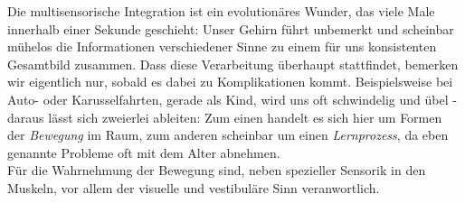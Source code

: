 Die multisensorische Integration ist ein evolution\"ares Wunder, das viele Male innerhalb einer Sekunde geschieht: 
Unser Gehirn f\"uhrt unbemerkt und scheinbar m\"uhelos die Informationen verschiedener Sinne zu einem f\"ur uns konsistenten Gesamtbild zusammen. 
Dass diese Verarbeitung \"uberhaupt stattfindet, bemerken wir eigentlich nur, sobald es dabei zu Komplikationen kommt. Beispielsweise bei Auto- oder Karusselfahrten, gerade als Kind, wird uns oft schwindelig und \"ubel - daraus l\"asst sich zweierlei ableiten: 
Zum einen handelt es sich hier um Formen der \textit{Bewegung} im Raum, zum anderen scheinbar um einen \textit{Lernprozess}, da eben genannte Probleme oft mit dem Alter abnehmen.\\
F\"ur die Wahrnehmung der Bewegung sind, neben spezieller Sensorik in den Muskeln, vor allem der visuelle und vestibuläre Sinn veranwortlich. 
